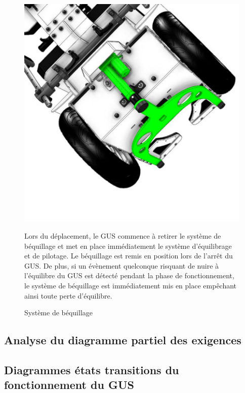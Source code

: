 \begin{figure}[ht!]
\begin{minipage}{0.5\linewidth}
\centering\includegraphics[width=0.8\linewidth]{img/fig04}
\caption{\label{fig04}Système de béquillage}
\end{minipage}
\hfill
\begin{minipage}{0.45\linewidth}
Lors du déplacement, le GUS commence à retirer le système de béquillage et met en place immédiatement le système d'équilibrage et de pilotage. Le béquillage est remis en position lors de l'arrêt du GUS. De plus, si un évènement quelconque risquant de nuire à l'équilibre du GUS est détecté
pendant la phase de fonctionnement, le système de béquillage est immédiatement mis en place empêchant ainsi toute perte d'équilibre.
\end{minipage}
\end{figure}

\subsection{Analyse du diagramme partiel des exigences}


\subsection{Diagrammes états transitions du fonctionnement du GUS}

